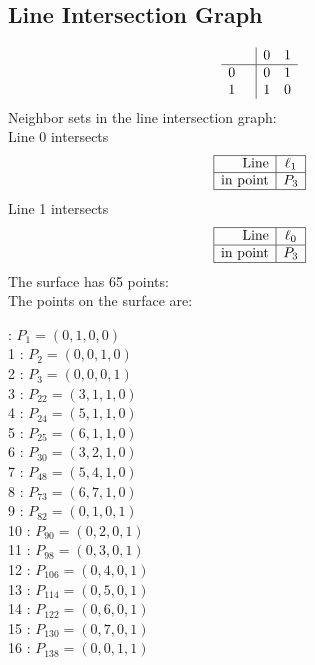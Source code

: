 \documentclass{article}
\begin{document}
{\subsection*{Line Intersection Graph}
{\arraycolsep=1pt
$$
\begin{array}{rr|*{2}r}
 &  & 0 & 1\\
\hline
0 &  & 0 & 1\\
1 &  & 1 & 0\\
\end{array}
$$
}%
Neighbor sets in the line intersection graph:\\
Line 0 intersects 
$$
\begin{array}{|r*{1}{|c}|}
\hline
\mbox{Line}  & \ell_{1}\\
\hline
\mbox{in point}  & P_{3}\\
\hline
\end{array}
$$
Line 1 intersects 
$$
\begin{array}{|r*{1}{|c}|}
\hline
\mbox{Line}  & \ell_{0}\\
\hline
\mbox{in point}  & P_{3}\\
\hline
\end{array}
$$
The surface has 65 points:\\
The points on the surface are:\\
\begin{multicols}{3}
 : $P_{1}=( 0, 1, 0, 0 )$\\
1 : $P_{2}=( 0, 0, 1, 0 )$\\
2 : $P_{3}=( 0, 0, 0, 1 )$\\
3 : $P_{22}=( 3, 1, 1, 0 )$\\
4 : $P_{24}=( 5, 1, 1, 0 )$\\
5 : $P_{25}=( 6, 1, 1, 0 )$\\
6 : $P_{30}=( 3, 2, 1, 0 )$\\
7 : $P_{48}=( 5, 4, 1, 0 )$\\
8 : $P_{73}=( 6, 7, 1, 0 )$\\
9 : $P_{82}=( 0, 1, 0, 1 )$\\
10 : $P_{90}=( 0, 2, 0, 1 )$\\
11 : $P_{98}=( 0, 3, 0, 1 )$\\
12 : $P_{106}=( 0, 4, 0, 1 )$\\
13 : $P_{114}=( 0, 5, 0, 1 )$\\
14 : $P_{122}=( 0, 6, 0, 1 )$\\
15 : $P_{130}=( 0, 7, 0, 1 )$\\
16 : $P_{138}=( 0, 0, 1, 1 )$\\

\end{multicols}}
\end{document}
